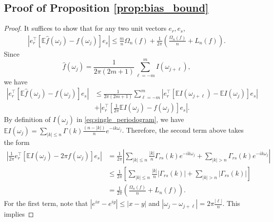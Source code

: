 \subsection{Proof of Proposition \ref{prop:bias_bound}}
\begin{proof}
It suffices to show that for any two unit vectors $e_r,e_s$, 
\begin{equation}
\begin{aligned}
\left|e_r^\top \left[\mathbb{E}\hat{f}(\omega_j) - f(\omega_j)\right]e_s\right| \le \frac{m}{n}\Omega_n(f) + \frac{1}{2\pi}\left(\frac{\Omega_n(f)}{n}+L_n(f)\right). \nonumber
\end{aligned}
\end{equation}
Since  
\begin{equation}
\hat{f}(\omega_j) = \frac{1}{2\pi(2m+1)} \sum_{\ell =-m}^m I(\omega_{j+\ell}),  \nonumber
\end{equation}
we have 
\begin{equation}
\label{eq:mul_dev}
\begin{aligned}
\left|e_r^\top \left[\mathbb{E}\hat{f}(\omega_j) - f(\omega_j)\right]e_s\right| 
&\le \frac{1}{2\pi(2m+1)} \sum_{\ell = -m}^m |e_r^\top\left[\mathbb{E}I(\omega_{j+\ell}) - \mathbb{E} I(\omega_{j})\right]e_s|\\
&+\left|e_r^\top \left[\frac{1}{2\pi}\mathbb{E}I(\omega_j) - f(\omega_j)\right]e_s\right|. 
\end{aligned}
\end{equation}
By definition of $I(\omega_j)$ in \eqref{eq:single_periodogram}, we have $\mathbb{E} I(\omega_j) = \sum_{|k| \le n} \Gamma(k) \frac{(n-|k|)}{n} e^{-ik \omega_j}$.  Therefore, the second term above takes the form 
\begin{equation}
\label{eq:mul_dev1}
\begin{aligned}
\left|\frac{1}{2\pi} e_r^\top \left[\mathbb{E} I(\omega_j) - 2\pi f(\omega_j)\right]e_s\right| &= \frac{1}{2\pi}\left|\sum_{|k|\le n} \frac{|k|}{n}  \Gamma_{rs}(k) e^{-ik\omega_j}+\sum_{|k|>n} \Gamma_{rs}(k) e^{-ik\omega_j}\right|\\
&\le \frac{1}{2\pi} \left [\sum_{|k|\le n} \frac{|k|}{n}  |\Gamma_{rs}(k)|+ \sum_{|k|>n} |\Gamma_{rs}(k)|\right]\\
&= \frac{1}{2\pi}\left(\frac{\Omega_n(f)}{n} + L_n(f)\right). 
\end{aligned}
\end{equation}
For the first term, note that $|e^{ix} - e^{iy}|\le |x-y|$ and $|\omega_j-\omega_{j+\ell}| = 2\pi \frac{|\ell|}{n}$. This implies 

\end{proof}
